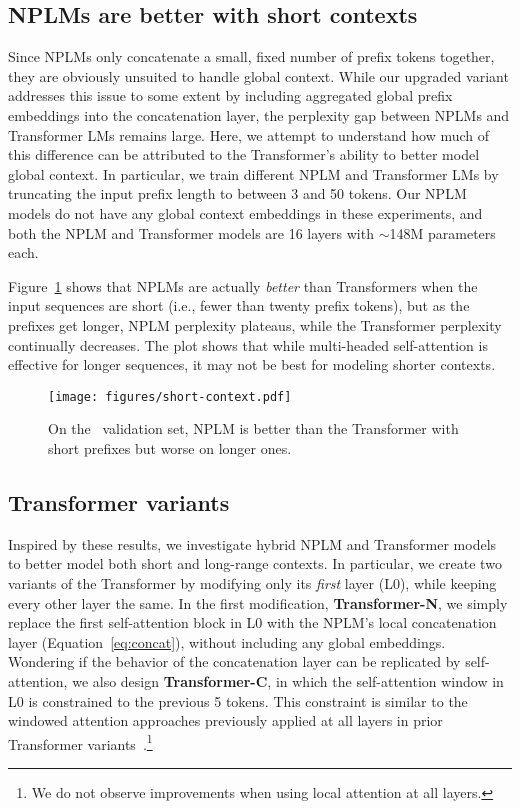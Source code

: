 \documentclass[11pt]{article}
\begin{document}
\subsection{NPLMs are better with short contexts} \label{sec:short-context}
Since NPLMs only concatenate a small, fixed number of prefix tokens together, they are obviously unsuited to handle global context. While our upgraded variant addresses this issue to some extent by including aggregated global prefix embeddings into the concatenation layer, the perplexity gap between NPLMs and Transformer LMs remains large. Here, we attempt to understand how much of this difference can be attributed to the Transformer's ability to better model global context. In particular, we train different NPLM and Transformer LMs by truncating the input prefix length to between 3 and 50 tokens. Our NPLM models do not have any global context embeddings in these experiments, and both the NPLM and Transformer models are 16 layers with $\sim$148M parameters each.

Figure~\ref{fig:short-context-l0-constrain} shows that NPLMs are actually \emph{better} than Transformers when the input sequences are short (i.e., fewer than twenty prefix tokens), but as the prefixes get longer, NPLM perplexity plateaus, while the Transformer perplexity continually decreases. The plot shows that while multi-headed self-attention is effective for longer sequences, it may not be best for modeling shorter contexts.

\begin{figure} [t]
    \centering \texttt{[image: figures/short-context.pdf]} 
    \caption{On the \wtthree\ validation set, NPLM is better than the Transformer with short prefixes but worse on longer ones. 
    }
    \label{fig:short-context-l0-constrain}
\end{figure}


\subsection{Transformer variants}

Inspired by these results, we investigate hybrid NPLM and Transformer models to better model both short and long-range contexts. In particular, we create two variants of the Transformer by modifying only its \emph{first} layer (L0), while keeping every other layer the same. In the first modification, \textbf{Transformer-N}, we simply replace the first self-attention block in L0 with the NPLM's local concatenation layer (Equation~\ref{eq:concat}), without including any global embeddings. Wondering if the behavior of the concatenation layer can be replicated by self-attention, we also design \textbf{Transformer-C}, in which the self-attention window in L0 is constrained to the previous 5 tokens. 
This constraint is similar to the windowed attention approaches previously applied at all layers in prior Transformer variants~\citep{Beltagy2020Longformer,Roy2020EfficientCS}.\footnote{We do not observe improvements when using local attention at all layers.} 
\end{document}
